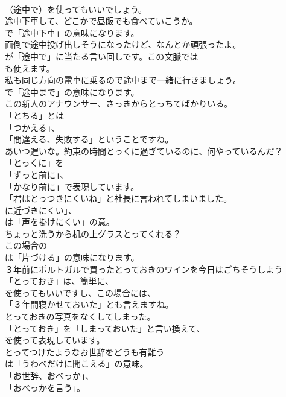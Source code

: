 \documentclass[8pt]{extreport}
\begin{document}
\begin{CJK}{UTF8}{min}
\\	（途中で）を使ってもいいでしょう。	
\\	途中下車して、どこかで昼飯でも食べていこうか。 
\\	で「途中下車」の意味になります。	
\\	面倒で途中投げ出しそうになったけど、なんとか頑張ったよ。 
\\	が「途中で」に当たる言い回しです。この文脈では 
\\	も使えます。	
\\	私も同じ方向の電車に乗るので途中まで一緒に行きましょう。 
\\	で「途中まで」の意味になります。	
\\	この新人のアナウンサー、さっきからとっちてばかりいる。 
\\	「とちる」とは
\\	「つかえる」、
\\	「間違える、失敗する」ということですね。	
\\	あいつ遅いな。約束の時間とっくに過ぎているのに、何やっているんだ？ 
\\	「とっくに」を
\\	「ずっと前に」、
\\	「かなり前に」で表現しています。	
\\	「君はとっつきにくいね」と社長に言われてしまいました。 
\\	に近づきにくい」、
\\	は「声を掛けにくい」の意。	
\\	ちょっと洗うから机の上グラスとってくれる？ 
\\	この場合の
\\	は「片づける」の意味になります。	
\\	３年前にポルトガルで買ったとっておきのワインを今日はごちそうしよう 
\\	「とっておき」は、簡単に、
\\	を使ってもいいですし、この場合には、
\\	「３年間寝かせておいた」とも言えますね。	
\\	とっておきの写真をなくしてしまった。 
\\	「とっておき」を「しまっておいた」と言い換えて、
\\	を使って表現しています。	
\\	とってつけたようなお世辞をどうも有難う 
\\	は「うわべだけに聞こえる」の意味。
\\	「お世辞、おべっか」、
\\	「おべっかを言う」。	

\end{CJK}
\end{document}
